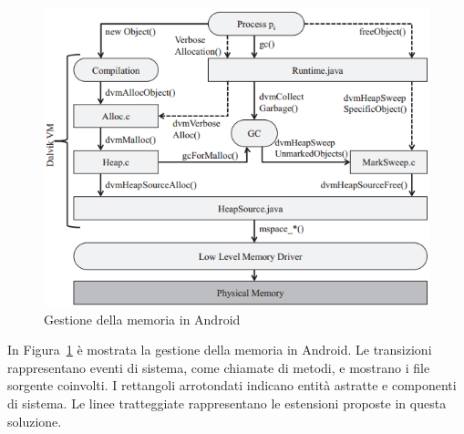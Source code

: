 \begin{figure}[h]
	\centering
	\includegraphics[width=0.7\linewidth]{../images/androidMemoryManagement}
	\caption{Gestione della memoria in Android}
	\label{fig:androidmemorymanagement}
\end{figure}

In Figura~\ref{fig:androidmemorymanagement} è mostrata la gestione della memoria in Android. Le transizioni rappresentano eventi di sistema, come chiamate di metodi, e mostrano i file sorgente coinvolti. I rettangoli arrotondati indicano entità astratte e componenti di sistema. Le linee tratteggiate rappresentano le estensioni proposte in questa soluzione. 

